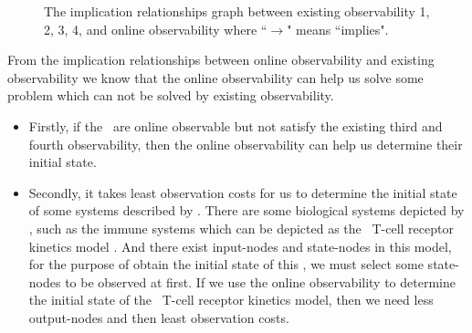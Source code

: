 \begin{figure}[thpb]
      \centering
      
      \caption{The implication relationships graph between existing observability 1, 2, 3, 4, and online observability where ``$\rightarrow$" means ``implies".}
      \label{fig:7}
   \end{figure}

From the implication relationships between online observability and existing observability we know that the online observability can help us solve some problem which can not be solved by existing observability. 
 \begin{itemize}
 \item Firstly, if the \BCNs\ are online observable but not satisfy the existing third and fourth observability, then the online observability can help us determine their initial state. 
 \item Secondly, it takes least observation costs for us to determine the initial state of some systems described by \BCNs. There are some biological systems depicted by \BCNs, such as the immune systems which can be depicted as the \BCN\ T-cell receptor kinetics model \cite{Klamt2006A}. And there exist input-nodes and state-nodes in this model, for the purpose of obtain the initial state of this \BCN, we must select some state-nodes to be observed at first. If we use the online observability to determine the initial state of the \BCN\ T-cell receptor kinetics model, then we need less output-nodes and then least observation costs. 
 \end{itemize}

